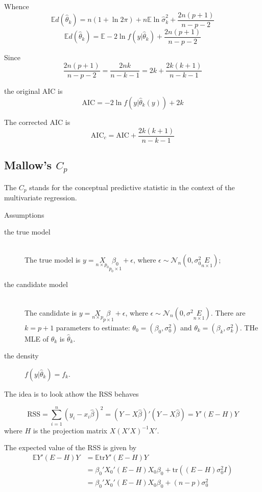 \documentclass[a4paper]{article}
\newcommand{\brac}[1]{{\left ( #1 \right )}}
\newcommand{\induc}[1]{{\left . #1 \right \vert}}
\newcommand{\Ncal}{\mathcal{N}}
\newcommand{\ex}{\mathbb{E}}
\newcommand{\RSS}{\text{RSS}}
\newcommand{\tr}{\text{tr}}
\begin{document}
Whence 
\[\ex d\brac{\hat{\theta}_k} = n \brac{1+\ln 2\pi} + n\ex \ln \hat{\sigma}^2_k + \frac{2n(p+1)}{n-p-2}\]
\[\ex d\brac{\hat{\theta}_k} = \ex -2 \ln f\brac{\induc{y}\hat{\theta}_k} + \frac{2n(p+1)}{n-p-2}\]

Since 
\[\frac{2n(p+1)}{n-p-2} = \frac{2nk}{n-k-1} = 2k + \frac{2k(k+1)}{n-k-1}\]

the original AIC is
\[\text{AIC} = -2 \ln f\brac{\induc{y}\hat{\theta}_k(y)} + 2k\]

The corrected AIC is 
\[\text{AIC}_c = \text{AIC} + \frac{2k(k+1)}{n-k-1}\]


\subsection{Mallow's $C_p$} %
\label{sub:mallows_cp}

The $C_p$ stands for the conceptual predictive statistic in the context of the multivariate regression.

Assumptions \begin{description}
	\item[the true model]\hfill\\
	The true model is $y = \underset{n\times p_0}{X}\underset{p_0\times 1}{\beta_0} + \epsilon$, where $\epsilon \sim \Ncal_n\brac{0,\sigma_0^2 \underset{n\times 1}{E}}$;
	\item[the candidate model] \hfill\\
	The candidate is $y = \underset{n\times p}{X}\underset{p\times 1}{\beta} + \epsilon$, where $\epsilon \sim \Ncal_n\brac{0,\sigma^2 \underset{n\times 1}{E}}$.
	There are $k=p+1$ parameters to estimate: $\theta_0 = \brac{\beta_0,\sigma_0^2}$ and $\theta_k = \brac{\beta_k,\sigma_k^2}$. THe MLE of $\theta_k$ is $\hat{\theta}_k$.
	\item[the density] $f\brac{\induc{y}\hat{\theta}_k} = f_k$.
\end{description}

The idea is to look athow the RSS behaves

\[\RSS = \sum_{i=1}^n \brac{y_i - x_i \hat{\beta}}^2 = \brac{Y-X\hat{\beta}}'\brac{Y-X\hat{\beta}} = Y'\brac{E-H}Y\]
where $H$ is the projection matrix $X\brac{X'X}^{-1}X'$.

The expected value of the RSS is given by
\begin{align*}
	\ex Y'\brac{E-H}Y &= \ex\tr{Y'\brac{E-H}Y} \\
		&= \beta_0'X_0' \brac{E-H} X_0\beta_0 + \tr\brac{\brac{E-H} \sigma^2_0 I}\\
		&= \beta_0'X_0' \brac{E-H} X_0\beta_0 + (n-p)\sigma^2_0
\end{align*}
\end{document}
